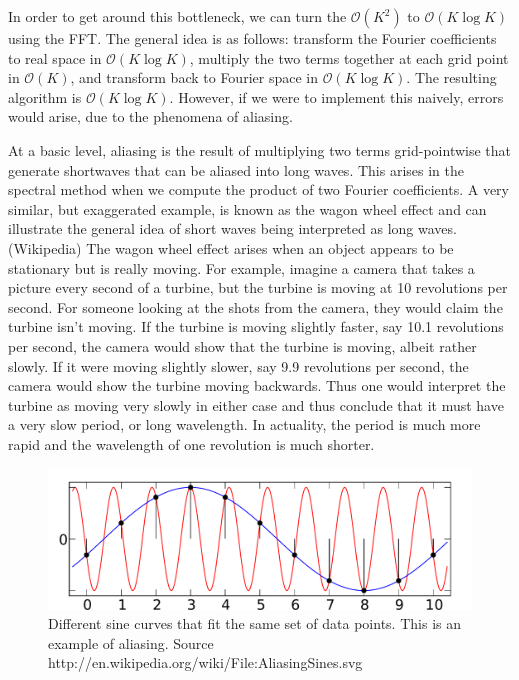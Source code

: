In order to get around this bottleneck, we can turn the $\mathcal{O}(K^{2})$ to $\mathcal{O}(K\log K)$ using the FFT. The general idea is as follows: transform the Fourier coefficients to real space in $\mathcal{O}(K\log K)$, multiply the two terms together at each grid point in $\mathcal{O}(K)$, and transform back to Fourier space in $\mathcal{O}(K\log K)$. The resulting algorithm is $\mathcal{O}(K\log K)$. However, if we were to implement this naively, errors would arise, due to the phenomena of aliasing. 

At a basic level, aliasing is the result of multiplying two terms grid-pointwise that generate shortwaves that can be aliased into long waves. This arises in the spectral method when we compute the product of two Fourier coefficients. A very similar, but exaggerated example, is known as the wagon wheel effect and can illustrate the general idea of short waves being interpreted as long waves. (Wikipedia) The wagon wheel effect arises when an object appears to be stationary but is really moving. For example, imagine a camera that takes a picture every second of a turbine, but the turbine is moving at 10 revolutions per second. For someone looking at the shots from the camera, they would claim the turbine isn't moving. If the turbine is moving slightly faster, say 10.1 revolutions per second, the camera would show that the turbine is moving, albeit rather slowly. If it were moving slightly slower, say 9.9 revolutions per second, the camera would show the turbine moving backwards. Thus one would interpret the turbine as moving very slowly in either case and thus conclude that it must have a very slow period, or long wavelength. In actuality, the period is much more rapid and the wavelength of one revolution is much shorter.  
\begin{figure}
\begin{center}
\includegraphics[width=\textwidth]{aliassine.pdf}
\caption{Different sine curves that fit the same set of data points. This is an example of aliasing. Source http://en.wikipedia.org/wiki/File:AliasingSines.svg}
\label{aliassine}
\end{center}
\end{figure}

